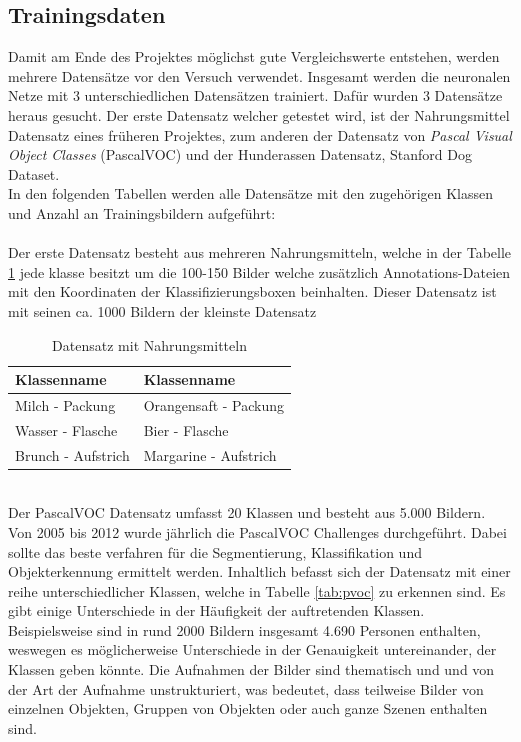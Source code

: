 \documentclass[a4paper,12pt,oneside]{article}
\begin{document}
  \subsection{Trainingsdaten}\label{s.tdaten}
Damit am Ende des Projektes möglichst gute Vergleichswerte entstehen, werden mehrere Datensätze vor den Versuch verwendet. Insgesamt werden die neuronalen Netze mit 3 unterschiedlichen Datensätzen trainiert. Dafür wurden 3 Datensätze heraus gesucht. Der erste Datensatz welcher getestet wird, ist der Nahrungsmittel Datensatz eines früheren Projektes, zum anderen der Datensatz von \textit{Pascal Visual Object Classes} (PascalVOC) und der Hunderassen Datensatz, Stanford Dog Dataset.\\
In den folgenden Tabellen werden alle Datensätze mit den zugehörigen Klassen und Anzahl an Trainingsbildern aufgeführt:\\\\
Der erste Datensatz besteht aus mehreren Nahrungsmitteln, welche in der Tabelle \ref{tab:nahrungsmittel} jede klasse besitzt um die 100-150 Bilder welche zusätzlich Annotations-Dateien mit den Koordinaten der Klassifizierungsboxen beinhalten. Dieser Datensatz ist mit seinen ca. 1000 Bildern der kleinste Datensatz 
\begin{table}
[h]
\caption{Datensatz mit Nahrungsmitteln}
\centering
\begin{tabular}{|l|l|}
\hline
Klassenname & Klassenname\\
\hline
Milch - Packung & Orangensaft - Packung\\
Wasser - Flasche & Bier - Flasche\\
Brunch - Aufstrich & Margarine - Aufstrich\\

\hline
\end{tabular}
\label{tab:nahrungsmittel}
\end{table}\\
Der PascalVOC Datensatz umfasst 20 Klassen und besteht aus 5.000 Bildern. Von 2005 bis 2012 wurde jährlich die PascalVOC Challenges durchgeführt. Dabei sollte das beste verfahren für die Segmentierung, Klassifikation und Objekterkennung ermittelt werden. Inhaltlich befasst sich der Datensatz mit einer reihe unterschiedlicher Klassen, welche in Tabelle \ref{tab:pvoc} zu erkennen sind. Es gibt einige Unterschiede in der Häufigkeit der auftretenden Klassen. Beispielsweise sind in rund 2000 Bildern insgesamt 4.690 Personen enthalten, weswegen es möglicherweise Unterschiede in der Genauigkeit untereinander, der Klassen geben könnte. Die Aufnahmen der Bilder sind thematisch und und von der Art der Aufnahme unstrukturiert, was bedeutet, dass teilweise Bilder von einzelnen Objekten, Gruppen von Objekten oder auch ganze Szenen enthalten sind.\\
\end{document}
